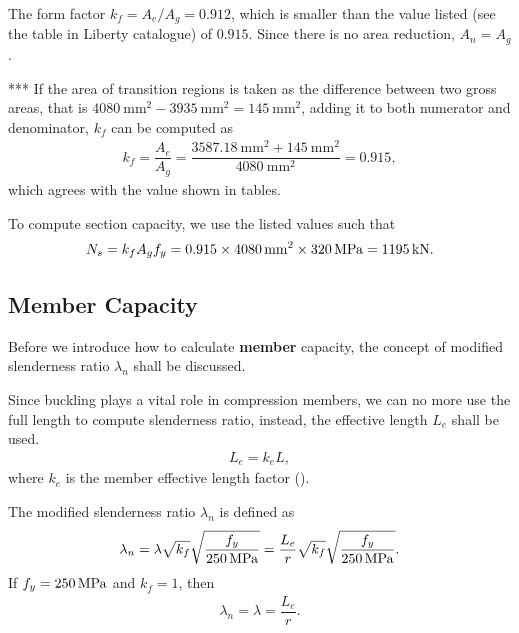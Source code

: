 \begin{solution}
The form factor $k_f=A_e/A_g=0.912$, which is smaller than the value listed (see the table in Liberty catalogue) of $0.915$. Since there is no area reduction, $A_n=A_g$.

*** If the area of transition regions is taken as the difference between two gross areas, that is $\SI{4080}{\mm^2}-\SI{3935}{\mm^2}=\SI{145}{\mm^2}$, adding it to both numerator and denominator, $k_f$ can be computed as
\begin{gather*}
k_f=\dfrac{A_e}{A_g}=\dfrac{\SI{3587.18}{\mm^2}+\SI{145}{\mm^2}}{\SI{4080}{\mm^2}}=0.915,
\end{gather*}
which agrees with the value shown in tables.

To compute section capacity, we use the listed values such that
\begin{gather*}
N_s=k_fA_gf_y=0.915\times\SI{4080}{\milli\meter^2}\times\SI{320}{\mega\pascal}=\SI{1195}{\kilo\newton}.
\end{gather*}
\end{solution}
\subsection{Member Capacity}\label{sec:n_c}
Before we introduce how to calculate \textbf{member} capacity, the concept of modified slenderness ratio $\lambda_n$ shall be discussed.

Since buckling plays a vital role in compression members, we can no more use the full length to compute slenderness ratio, instead, the effective length $L_e$ shall be used.
\begin{gather}
L_e=k_eL,
\end{gather}
where $k_e$ is the member effective length factor ().

The modified slenderness ratio $\lambda_n$ is defined as
\begin{gather}
\lambda_n=\lambda\sqrt{k_f}\sqrt{\dfrac{f_y}{\SI{250}{\mega\pascal}}}=\dfrac{L_e}{r}\sqrt{k_f}\sqrt{\dfrac{f_y}{\SI{250}{\mega\pascal}}}.
\end{gather}
If $f_y=\SI{250}{\mega\pascal}$ and $k_f=1$, then
\begin{gather*}
\lambda_n=\lambda=\dfrac{L_e}{r}.
\end{gather*}

